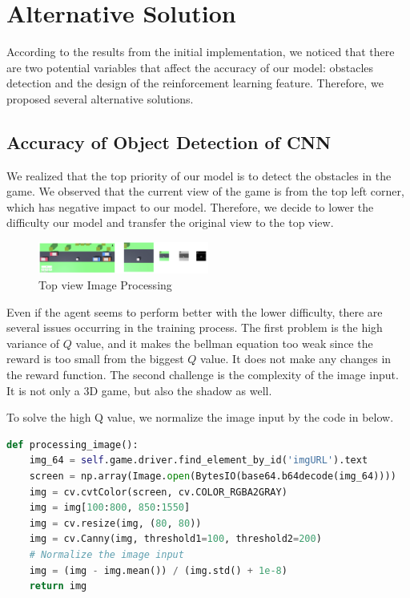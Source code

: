 \documentclass{article}
\begin{document}
\section{Alternative Solution}

According to the results from the initial implementation, we noticed that there are two potential variables that affect the accuracy of our model: obstacles detection and the design of the reinforcement learning feature. Therefore, we proposed several alternative solutions.

\subsection{Accuracy of Object Detection of CNN}
We realized that the top priority of our model is to detect the obstacles in the game. We observed that the current view of the game is from the top left corner, which has negative impact to our model. Therefore, we decide to lower the difficulty our model and transfer the original view to the top view. 

\begin{figure}[h]
    \caption{Top view Image Processing}
    \centering
    \includegraphics[width=0.5\textwidth]{topAngel.png}
\end{figure}

Even if the agent seems to perform better with the lower difficulty, there are several issues occurring in the training process. The first problem is the high variance of $Q$ value, and it makes the bellman equation too weak since the reward is too small from the biggest $Q$ value. It does not make any changes in the reward function. The second challenge is the complexity of the image input. It is not only a 3D game, but also the shadow as well. \par 

To solve the high Q value, we normalize the image input by the code in below. 
\begin{lstlisting}[language=Python]
def processing_image():
    img_64 = self.game.driver.find_element_by_id('imgURL').text
    screen = np.array(Image.open(BytesIO(base64.b64decode(img_64))))
    img = cv.cvtColor(screen, cv.COLOR_RGBA2GRAY)
    img = img[100:800, 850:1550]
    img = cv.resize(img, (80, 80))
    img = cv.Canny(img, threshold1=100, threshold2=200)
    # Normalize the image input
    img = (img - img.mean()) / (img.std() + 1e-8)
    return img
\end{lstlisting}
\end{document}
